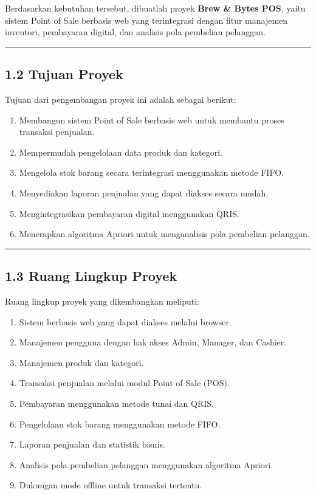 Berdasarkan kebutuhan tersebut, dibuatlah proyek \textbf{Brew \& Bytes POS}, yaitu sistem Point of Sale berbasis web yang terintegrasi dengan fitur manajemen inventori, pembayaran digital, dan analisis pola pembelian pelanggan.

\begin{center}\rule{0.5\linewidth}{0.5pt}\end{center}

\subsection{1.2 Tujuan Proyek}\label{tujuan-proyek}

Tujuan dari pengembangan proyek ini adalah sebagai berikut:

\begin{enumerate}
\def\labelenumi{\arabic{enumi}.}
\tightlist
\item
  Membangun sistem Point of Sale berbasis web untuk membantu proses transaksi penjualan.
\item
  Mempermudah pengelolaan data produk dan kategori.
\item
  Mengelola stok barang secara terintegrasi menggunakan metode FIFO.
\item
  Menyediakan laporan penjualan yang dapat diakses secara mudah.
\item
  Mengintegrasikan pembayaran digital menggunakan QRIS.
\item
  Menerapkan algoritma Apriori untuk menganalisis pola pembelian pelanggan.
\end{enumerate}

\begin{center}\rule{0.5\linewidth}{0.5pt}\end{center}

\subsection{1.3 Ruang Lingkup Proyek}\label{ruang-lingkup-proyek}

Ruang lingkup proyek yang dikembangkan meliputi:

\begin{enumerate}
\def\labelenumi{\arabic{enumi}.}
\tightlist
\item
  Sistem berbasis web yang dapat diakses melalui browser.
\item
  Manajemen pengguna dengan hak akses Admin, Manager, dan Cashier.
\item
  Manajemen produk dan kategori.
\item
  Transaksi penjualan melalui modul Point of Sale (POS).
\item
  Pembayaran menggunakan metode tunai dan QRIS.
\item
  Pengelolaan stok barang menggunakan metode FIFO.
\item
  Laporan penjualan dan statistik bisnis.
\item
  Analisis pola pembelian pelanggan menggunakan algoritma Apriori.
\item
  Dukungan mode offline untuk transaksi tertentu.
\end{enumerate}

